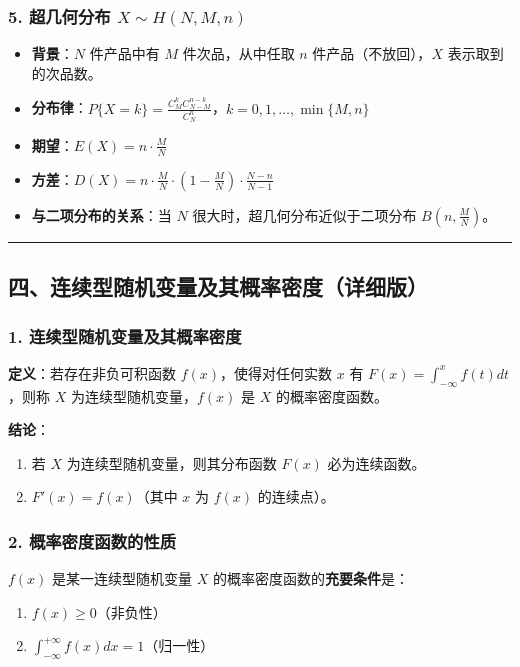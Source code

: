 \documentclass[12pt,a4paper]{ctexart}
\begin{document}
\subsubsection{5. 超几何分布 $X \sim H(N, M, n)$}
\begin{itemize}[noitemsep]
    \item \textbf{背景}：$N$ 件产品中有 $M$ 件次品，从中任取 $n$ 件产品（不放回），$X$ 表示取到的次品数。
    \item \textbf{分布律}：$P\{X = k\} = \frac{C_M^k C_{N-M}^{n-k}}{C_N^n}$，$k = 0,1,\dots,\min\{M,n\}$
    \item \textbf{期望}：$E(X) = n \cdot \frac{M}{N}$
    \item \textbf{方差}：$D(X) = n \cdot \frac{M}{N} \cdot \left(1 - \frac{M}{N}\right) \cdot \frac{N-n}{N-1}$
    \item \textbf{与二项分布的关系}：当 $N$ 很大时，超几何分布近似于二项分布 $B(n, \frac{M}{N})$。
\end{itemize}

\vspace{1em}\hrule\vspace{1em}

\subsection{四、连续型随机变量及其概率密度（详细版）}

\subsubsection{1. 连续型随机变量及其概率密度}
\textbf{定义}：若存在非负可积函数 $f(x)$，使得对任何实数 $x$ 有 $F(x) = \int_{-\infty}^x f(t) dt$，则称 $X$ 为连续型随机变量，$f(x)$ 是 $X$ 的概率密度函数。

\textbf{结论}：
\begin{enumerate}[noitemsep]
    \item 若 $X$ 为连续型随机变量，则其分布函数 $F(x)$ 必为连续函数。
    \item $F'(x) = f(x)$（其中 $x$ 为 $f(x)$ 的连续点）。
\end{enumerate}

\subsubsection{2. 概率密度函数的性质}
$f(x)$ 是某一连续型随机变量 $X$ 的概率密度函数的\textbf{充要条件}是：
\begin{enumerate}[noitemsep]
    \item $f(x) \ge 0$（非负性）
    \item $\int_{-\infty}^{+\infty} f(x) dx = 1$（归一性）
\end{enumerate}
\end{document}
